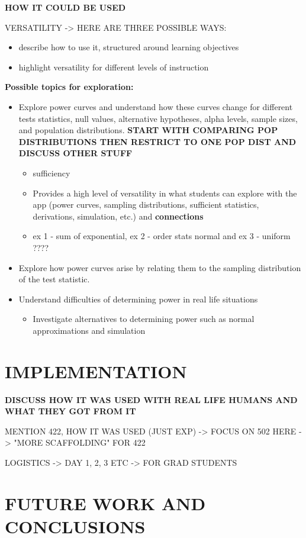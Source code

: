 \documentclass{TISE}
\begin{document}
\textbf{HOW IT COULD BE USED}

VERSATILITY -> HERE ARE THREE POSSIBLE WAYS:

\begin{itemize}
	\item describe how to use it, structured around learning objectives
	\item highlight versatility for different levels of instruction
\end{itemize}


\textbf{Possible topics for exploration:}
\begin{itemize}
	\item Explore power curves and understand how these curves change for different tests statistics, null values, alternative hypotheses, alpha levels, sample sizes, and population distributions. \textbf{START WITH COMPARING POP DISTRIBUTIONS THEN RESTRICT TO ONE POP DIST AND DISCUSS OTHER STUFF}
	\begin{itemize}
		\item sufficiency
		\item Provides a high level of versatility in what students can explore with the app (power curves, sampling distributions, sufficient statistics, derivations, simulation, etc.) and \textbf{connections}
		\item ex 1 - sum of exponential, ex 2 - order stats normal and ex 3 - uniform ????
	\end{itemize}

	
	\item Explore how power curves arise by relating them to the sampling distribution of the test statistic. 
	\item Understand difficulties of determining power in real life situations
	\begin{itemize}
		\item Investigate alternatives to determining power such as normal approximations and simulation
	\end{itemize}
\end{itemize}

\section{IMPLEMENTATION}

\textbf{DISCUSS HOW IT WAS USED WITH REAL LIFE HUMANS AND WHAT THEY GOT FROM IT}

MENTION 422, HOW IT WAS USED (JUST EXP) -> FOCUS ON 502 HERE -> "MORE SCAFFOLDING" FOR 422

LOGISTICS -> DAY 1, 2, 3 ETC -> FOR GRAD STUDENTS



\section{FUTURE WORK AND CONCLUSIONS}



\newpage

\end{document}

